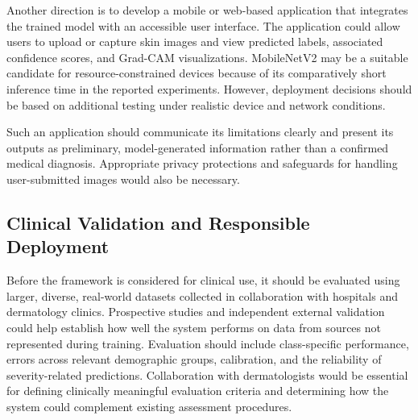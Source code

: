 Another direction is to develop a mobile or web-based application that integrates the trained model with an accessible user interface. The application could allow users to upload or capture skin images and view predicted labels, associated confidence scores, and Grad-CAM visualizations. MobileNetV2 may be a suitable candidate for resource-constrained devices because of its comparatively short inference time in the reported experiments. However, deployment decisions should be based on additional testing under realistic device and network conditions.

Such an application should communicate its limitations clearly and present its outputs as preliminary, model-generated information rather than a confirmed medical diagnosis. Appropriate privacy protections and safeguards for handling user-submitted images would also be necessary.



\subsection{Clinical Validation and Responsible Deployment}

Before the framework is considered for clinical use, it should be evaluated using larger, diverse, real-world datasets collected in collaboration with hospitals and dermatology clinics. Prospective studies and independent external validation could help establish how well the system performs on data from sources not represented during training. Evaluation should include class-specific performance, errors across relevant demographic groups, calibration, and the reliability of severity-related predictions. Collaboration with dermatologists would be essential for defining clinically meaningful evaluation criteria and determining how the system could complement existing assessment procedures.

